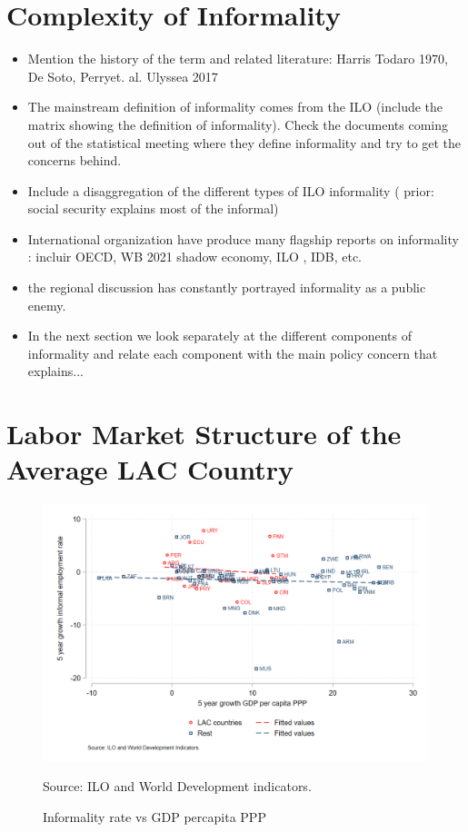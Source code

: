 \documentclass[english]{article}
\begin{document}
\section{Complexity of Informality}
\begin{itemize}
    \item Mention the history of the term and related literature: Harris Todaro 1970, De Soto, Perryet. al. Ulyssea 2017
 
    \item The mainstream definition of informality comes from the ILO (include the matrix showing the definition of informality). Check the documents coming out of the statistical meeting where they define informality and try to get the concerns behind. 
    \item Include a disaggregation of the different types of ILO informality ( prior: social security explains most of the informal)
       \item International organization have produce many flagship reports on informality : incluir OECD, WB 2021 shadow economy, ILO , IDB, etc. 
       \item the regional discussion has constantly portrayed informality as a public enemy.  
    \item In the next section we look separately at the different components of informality and relate each component with the main policy concern that explains...
\end{itemize}

\section{Labor Market Structure of the Average LAC Country}

\begin{figure}[H]
                \justifying
                \caption{Informality rate vs GDP percapita PPP}  
                \centerline{\includegraphics[scale=.3]{latex/figures/Evolution/Lastyear_growth.png}}
                \label{fig:info_gdp}
                \footnotesize{Source: ILO and World Development indicators.}
             \end{figure}
\end{document}
